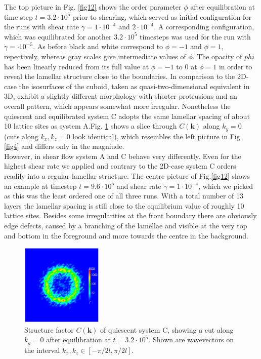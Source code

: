 \documentclass[8.5pt,twoside,twocolumn]{article}
\newcommand{\e}[1]{\cdot10^{#1}}
\newcommand{\gd}{\dot{\gamma}}
\begin{document}
The top picture in Fig. \ref{fig12} shows the order parameter $\phi$ after equilibration at time step $t=3.2\e{5}$ prior to shearing, which served as initial configuration for the runs with shear rate $\gd=1\e{-4}$ and $2\e{-4}$.
A corresponding configuration, which was equilibrated for another $3.2\e{5}$ timesteps was used for the run with $\gd=\e{-5}$.
As before black and white correspond to $\phi=-1$ and $\phi=1$, repectively, whereas gray scales give intermediate values of $\phi$.
The opacity of $phi$ has been linearly reduced from its full value at $\phi=-1$ to 0 at $\phi=1$ in order to reveal the lamellar structure close to the  boundaries.
In comparison to the 2D-case the isosurfaces of the cuboid, taken as quasi-two-dimensional equivalent in 3D, exhibit a slightly different morphology with shorter protrusions and an overall pattern, which appears somewhat more irregular.
Nonetheless the quiescent and equilibrated system C adopts the same lamellar spacing of about 10 lattice sites as system A.Fig. \ref{fig13} shows a slice through $C({\bm k})$ along $k_y=0$ (cuts along $k_x,k_z=0$ look identical), which resembles the left picture in Fig. \ref{fig4} and differs only in the magniude.\\ 
However, in shear flow system A and C behave very differently.
Even for the highest shear rate we applied and contrary to the 2D-case system C orders readily into a regular lamellar structure.
The centre picture of Fig.\ref{fig12} shows an example at timestep $t=9.6\e{5}$ and shear rate $\gd=1\e{-4}$, which we picked as this was the least ordered one of all three runs.
With a total number of 13 layers the lamellar spacing is still close to the equilibrium value of roughly 10 lattice sites.
Besides some irregularities at the front boundary there are obviously edge defects, caused by a branching of the lamellae and visible at the very top and bottom in the foreground and more towards the centre in the background.
\begin{figure}[!]
\centering
\includegraphics[angle=0,width=0.35\textwidth]{ck_y-slice_run786_320.jpg}
\caption{Structure factor $C({\mathbf k})$ of quiescent system C, showing a cut along $k_y=0$ after equilibration at $t=3.2\e{5}$. Shown are wavevectors on the interval $k_x, k_z\in[-\pi/2 l,\pi/2 l]$.}
\label{fig13}
\end{figure}
\end{document}
